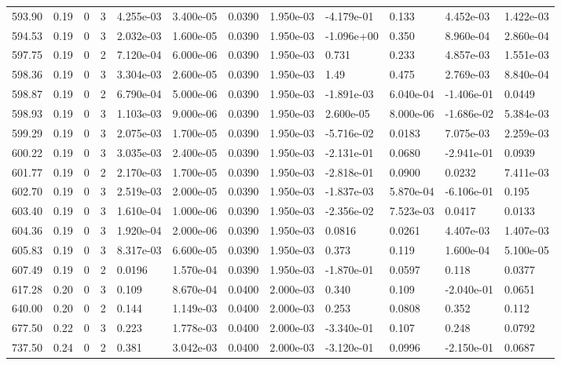 \documentclass[preview]{standalone}
\begin{document}
{{{{{{{{{{{{{{{{{{\begin{tabular}{L{1.2cm}C{1.2cm} C{0.3cm}C{0.5cm} C{1.4cm}C{1.4cm} C{1.4cm}C{1.4cm} C{1.6cm}C{1.6cm} C{1.6cm}C{1.6cm}}
  593.90  &  0.19  & 0     &  3 &  4.255e-03  & 3.400e-05  &  0.0390&   1.950e-03& -4.179e-01 & 0.133   &  4.452e-03 & 1.422e-03  \\ 
  594.53  &  0.19  & 0     &  3 &  2.032e-03  & 1.600e-05  &  0.0390&   1.950e-03& -1.096e+00 & 0.350   &  8.960e-04 & 2.860e-04  \\ 
  597.75  &  0.19  & 0     &  2 &  7.120e-04  & 6.000e-06  &  0.0390&   1.950e-03& 0.731 & 0.233   &  4.857e-03 & 1.551e-03  \\ 
  598.36  &  0.19  & 0     &  3 &  3.304e-03  & 2.600e-05  &  0.0390&   1.950e-03& 1.49 & 0.475   &  2.769e-03 & 8.840e-04  \\ 
  598.87  &  0.19  & 0     &  2 &  6.790e-04  & 5.000e-06  &  0.0390&   1.950e-03& -1.891e-03 & 6.040e-04   &  -1.406e-01 & 0.0449  \\ 
  598.93  &  0.19  & 0     &  3 &  1.103e-03  & 9.000e-06  &  0.0390&   1.950e-03& 2.600e-05 & 8.000e-06   &  -1.686e-02 & 5.384e-03  \\ 
  599.29  &  0.19  & 0     &  3 &  2.075e-03  & 1.700e-05  &  0.0390&   1.950e-03& -5.716e-02 & 0.0183   &  7.075e-03 & 2.259e-03  \\ 
  600.22  &  0.19  & 0     &  3 &  3.035e-03  & 2.400e-05  &  0.0390&   1.950e-03& -2.131e-01 & 0.0680   &  -2.941e-01 & 0.0939  \\ 
  601.77  &  0.19  & 0     &  2 &  2.170e-03  & 1.700e-05  &  0.0390&   1.950e-03& -2.818e-01 & 0.0900   &  0.0232 & 7.411e-03  \\ 
  602.70  &  0.19  & 0     &  3 &  2.519e-03  & 2.000e-05  &  0.0390&   1.950e-03& -1.837e-03 & 5.870e-04   &  -6.106e-01 & 0.195  \\ 
  603.40  &  0.19  & 0     &  3 &  1.610e-04  & 1.000e-06  &  0.0390&   1.950e-03& -2.356e-02 & 7.523e-03   &  0.0417 & 0.0133  \\ 
  604.36  &  0.19  & 0     &  3 &  1.920e-04  & 2.000e-06  &  0.0390&   1.950e-03& 0.0816 & 0.0261   &  4.407e-03 & 1.407e-03  \\ 
  605.83  &  0.19  & 0     &  3 &  8.317e-03  & 6.600e-05  &  0.0390&   1.950e-03& 0.373 & 0.119   &  1.600e-04 & 5.100e-05  \\ 
  607.49  &  0.19  & 0     &  2 &  0.0196  & 1.570e-04  &  0.0390&   1.950e-03& -1.870e-01 & 0.0597   &  0.118 & 0.0377  \\ 
  617.28  &  0.20  & 0     &  3 &  0.109  & 8.670e-04  &  0.0400&   2.000e-03& 0.340 & 0.109   &  -2.040e-01 & 0.0651  \\ 
  640.00  &  0.20  & 0     &  2 &  0.144  & 1.149e-03  &  0.0400&   2.000e-03& 0.253 & 0.0808   &  0.352 & 0.112  \\ 
  677.50  &  0.22  & 0     &  3 &  0.223  & 1.778e-03  &  0.0400&   2.000e-03& -3.340e-01 & 0.107   &  0.248 & 0.0792  \\ 
  737.50  &  0.24  & 0     &  2 &  0.381  & 3.042e-03  &  0.0400&   2.000e-03& -3.120e-01 & 0.0996   &  -2.150e-01 & 0.0687  \\ 
\hline 
\end{tabular} 

}}}}}}}}}}}}}}}}}}
\end{document}
